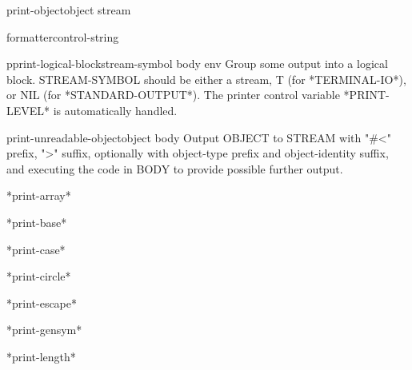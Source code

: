 \begin{generic}{print-object}{object stream}{}{}
  
\end{generic}

\begin{macro}{formatter}{control-string}{}{}
  
\end{macro}

\begin{macro}{pprint-logical-block}{stream-symbol \body body \env env}{}{}
  Group some output into a logical block. STREAM-SYMBOL should be either a
   stream, T (for *TERMINAL-IO*), or NIL (for *STANDARD-OUTPUT*). The printer
   control variable *PRINT-LEVEL* is automatically handled.
\end{macro}

\begin{macro}{print-unreadable-object}{object \body body}{}{}
  Output OBJECT to STREAM with "\#<" prefix, ">" suffix, optionally
  with object-type prefix and object-identity suffix, and executing the
  code in BODY to provide possible further output.
\end{macro}

\begin{variable}{*print-array*}{}{}{}
  
\end{variable}

\begin{variable}{*print-base*}{}{}{}
  
\end{variable}

\begin{variable}{*print-case*}{}{}{}
  
\end{variable}

\begin{variable}{*print-circle*}{}{}{}
  
\end{variable}

\begin{variable}{*print-escape*}{}{}{}
  
\end{variable}

\begin{variable}{*print-gensym*}{}{}{}
  
\end{variable}

\begin{variable}{*print-length*}{}{}{}
  
\end{variable}

